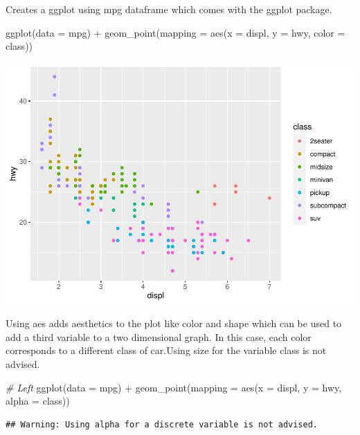 \documentclass[
]{article}
\newenvironment{Shaded}{\begin{snugshade}}{\end{snugshade}}
\newcommand{\AttributeTok}[1]{\textcolor[rgb]{0.77,0.63,0.00}{#1}}
\newcommand{\CommentTok}[1]{\textcolor[rgb]{0.56,0.35,0.01}{\textit{#1}}}
\newcommand{\FunctionTok}[1]{\textcolor[rgb]{0.00,0.00,0.00}{#1}}
\newcommand{\NormalTok}[1]{#1}
\newcommand{\SpecialCharTok}[1]{\textcolor[rgb]{0.00,0.00,0.00}{#1}}
\begin{document}
Creates a ggplot using mpg dataframe which comes with the ggplot
package.

\begin{Shaded}
\begin{Highlighting}[]
\FunctionTok{ggplot}\NormalTok{(}\AttributeTok{data =}\NormalTok{ mpg) }\SpecialCharTok{+} 
  \FunctionTok{geom\_point}\NormalTok{(}\AttributeTok{mapping =} \FunctionTok{aes}\NormalTok{(}\AttributeTok{x =}\NormalTok{ displ, }\AttributeTok{y =}\NormalTok{ hwy, }\AttributeTok{color =}\NormalTok{ class))}
\end{Highlighting}
\end{Shaded}

\includegraphics{Assignments_files/figure-latex/unnamed-chunk-39-1.pdf}

Using aes adds aesthetics to the plot like color and shape which can be
used to add a third variable to a two dimensional graph. In this case,
each color corresponds to a different class of car.Using size for the
variable class is not advised.

\begin{Shaded}
\begin{Highlighting}[]
\CommentTok{\# Left}
\FunctionTok{ggplot}\NormalTok{(}\AttributeTok{data =}\NormalTok{ mpg) }\SpecialCharTok{+} 
  \FunctionTok{geom\_point}\NormalTok{(}\AttributeTok{mapping =} \FunctionTok{aes}\NormalTok{(}\AttributeTok{x =}\NormalTok{ displ, }\AttributeTok{y =}\NormalTok{ hwy, }\AttributeTok{alpha =}\NormalTok{ class))}
\end{Highlighting}
\end{Shaded}

\begin{verbatim}
## Warning: Using alpha for a discrete variable is not advised.
\end{verbatim}
\end{document}
